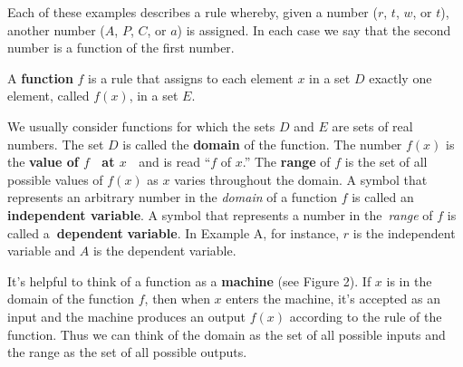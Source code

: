 \documentclass{sebase}
\begin{document}
Each of these examples describes a rule whereby, given a number ($r$, $t$, $%
w $, or $t$), another number ($A$, $P$, $C$, or $a$) is assigned. In each
case we say that the second number is a function of the first number.

\STARTBOX%

A \textbf{function} $f$ is a rule that assigns to each element $x$ in a set $%
D$ exactly one element, called $f\!\left( x\right) $, in a set $E$.

\ENDBOX%

We usually consider functions for which the sets $D$ and $E$ are sets of
real numbers. The set $D$ is called the \textbf{domain} of the function. The
number $f(x)$ is the \textbf{value of 
\mbox{\boldmath $f$}
\ at 
\mbox{\boldmath $x$}
\ }and is read ``$f$ of $x$.'' The \textbf{range} of $f$ is the set of all
possible values of $f(x)$ as $x$ varies throughout the domain. A symbol that
represents an arbitrary number in the \textit{domain} of a function $f$ is
called an \textbf{independent variable}. A symbol that represents a number
in the\textit{\ range} of $f$ is called a\textbf{\ dependent} \textbf{%
variable}. In Example A, for instance, $r$ is the independent variable and $%
A $ is the dependent variable.

It's helpful to think of a function as a \textbf{machine} (see Figure 2). If 
$x$ is in the domain of the function $f$, then when $x$ enters the machine,
it's accepted as an input and the machine produces an output $f(x)$
according to the rule of the function. Thus we can \pagebreak \linebreak
think of the domain as the set of all possible inputs and the range as the
set of all possible outputs.\\[6pt]
\hspace*{\fill}\hspace*{\fill}\vspace*{6pt%
}
\end{document}
